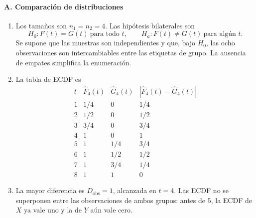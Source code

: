 \paragraph*{A. Comparación de distribuciones}
\begin{enumerate}
  \item Los tamaños son $n_1=n_2=4$. Las hipótesis bilaterales son
  \[
    H_0:F(t)=G(t)\ \text{para todo }t,
    \qquad
    H_a:F(t)\ne G(t)\ \text{para algún }t.
  \]
  Se supone que las muestras son independientes y que, bajo $H_0$, las ocho observaciones son intercambiables entre las etiquetas de grupo. La ausencia de empates simplifica la enumeración.
  \item La tabla de ECDF es
  \[
  \begin{array}{c|c|c|c}
    t & \widehat F_4(t) & \widehat G_4(t) & |\widehat F_4(t)-\widehat G_4(t)|\\
    \hline
    1 & 1/4 & 0   & 1/4\\
    2 & 1/2 & 0   & 1/2\\
    3 & 3/4 & 0   & 3/4\\
    4 & 1   & 0   & 1\\
    5 & 1   & 1/4 & 3/4\\
    6 & 1   & 1/2 & 1/2\\
    7 & 1   & 3/4 & 1/4\\
    8 & 1   & 1   & 0
  \end{array}
  \]
  \item La mayor diferencia es $D_{\mathrm{obs}}=1$, alcanzada en $t=4$. Las ECDF no se superponen entre las observaciones de ambos grupos: antes de $5$, la ECDF de $X$ ya vale uno y la de $Y$ aún vale cero.

  \begin{center}
  \end{center}


\end{enumerate}
